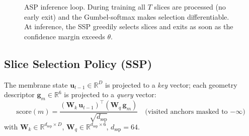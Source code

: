 \documentclass[11pt,a4paper]{article}
\begin{document}
\begin{figure}[H]
\caption{ASP inference loop. During training all $T$ slices are processed
         (no early exit) and the Gumbel-softmax makes selection differentiable.
         At inference, the SSP greedily selects slices and exits as soon as
         the confidence margin exceeds $\theta$.}
\label{fig:arch}
\end{figure}

\subsection{Slice Selection Policy (SSP)}

The membrane state $\mathbf{u}_{t-1} \in \mathbb{R}^D$ is projected to a
\emph{key} vector; each geometry descriptor $\mathbf{g}_m \in \mathbb{R}^6$
is projected to a \emph{query} vector:
\begin{equation}
  \text{score}(m) =
  \frac{(\mathbf{W}_k\,\mathbf{u}_{t-1})^\top (\mathbf{W}_q\,\mathbf{g}_m)}
       {\sqrt{d_\text{ssp}}}
  \quad \text{(visited anchors masked to } {-\infty}\text{)}
  \label{eq:ssp_score}
\end{equation}
with $\mathbf{W}_k \in \mathbb{R}^{d_\text{ssp}\times D}$,
$\mathbf{W}_q \in \mathbb{R}^{d_\text{ssp}\times 6}$, $d_\text{ssp}{=}64$.
\end{document}
